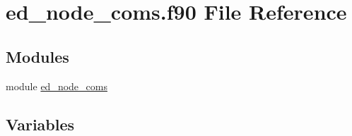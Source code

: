 \hypertarget{ed__node__coms_8f90}{}\section{ed\+\_\+node\+\_\+coms.\+f90 File Reference}
\label{ed__node__coms_8f90}
\subsection*{Modules}
\begin{DoxyCompactItemize}
\item 
module \hyperlink{namespaceed__node__coms}{ed\+\_\+node\+\_\+coms}
\end{DoxyCompactItemize}
\subsection*{Variables}
